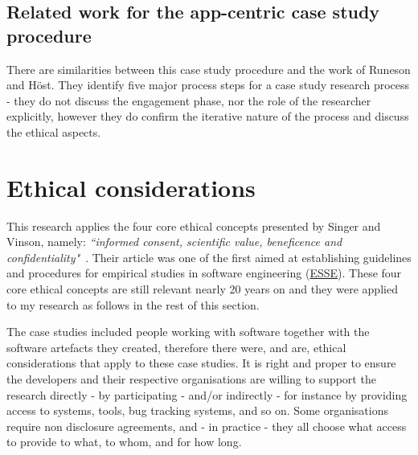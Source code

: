 \subsection{Related work for the app-centric case study procedure}
There are similarities between this case study procedure and the work of Runeson and Höst. They identify five major process steps for a case study research process \citep[pp. 137-138]{runeson_2008_guidelines_for_conducting_and_reporting_case_study_research_in_sw_eng} - they do not discuss the engagement phase, nor the role of the researcher explicitly, however they do confirm the iterative nature of the process and discuss the ethical aspects. %

\section{Ethical considerations}
\label{methodology-ethical-considerations-section}


This research applies the four core ethical concepts presented by Singer and Vinson, namely: \emph{``informed consent, scientific value, beneficence and confidentiality"}~\citep[p.1178]{singer2002_ethical_issues_in_empirical_studies_of_software_engineering}. Their article was one of the first aimed at establishing guidelines and procedures for empirical studies in software engineering (\href{glossary-esse}{ESSE}). These four core ethical concepts are still relevant nearly 20 years on and they were applied to my research as follows in the rest of this section.


The case studies included people working with software together with the software artefacts they created, therefore there were, and are, ethical considerations that apply to these case studies. 
It is right and proper to ensure the developers and their respective organisations are willing to support the research directly - by participating - and/or indirectly - for instance by providing access to systems, tools, bug tracking systems, and so on. Some organisations require non disclosure agreements, and - in practice - they all choose what access to provide to what, to whom, and for how long. 

